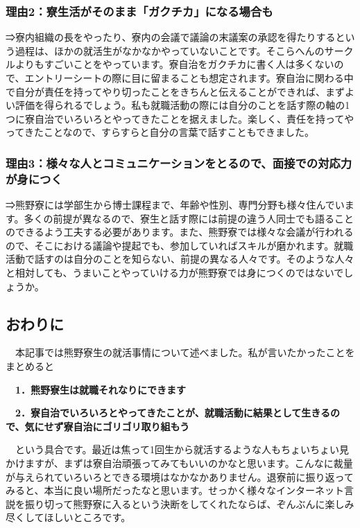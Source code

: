 \subsubsection{理由2：寮生活がそのまま「ガクチカ」になる場合も}
⇒寮内組織の長をやったり、寮内の会議で議論の末議案の承認を得たりするという過程は、ほかの就活生がなかなかやっていないことです。そこらへんのサークルよりもすごいことをやっています。寮自治をガクチカに書く人は多くないので、エントリーシートの際に目に留まることも想定されます。寮自治に関わる中で自分が責任を持ってやり切ったことをきちんと伝えることができれば、まずよい評価を得られるでしょう。私も就職活動の際には自分のことを話す際の軸の1つに寮自治でいろいろとやってきたことを据えました。楽しく、責任を持ってやってきたことなので、すらすらと自分の言葉で話すこともできました。

\subsubsection{理由3：様々な人とコミュニケーションをとるので、面接での対応力が身につく}
⇒熊野寮には学部生から博士課程まで、年齢や性別、専門分野も様々住んでいます。多くの前提が異なるので、寮生と話す際には前提の違う人同士でも語ることのできるよう工夫する必要があります。また、熊野寮では様々な会議が行われるので、そこにおける議論や提起でも、参加していればスキルが磨かれます。就職活動で話すのは自分のことを知らない、前提の異なる人々です。そのような人々と相対しても、うまいことやっていける力が熊野寮では身につくのではないでしょうか。

\subsection{おわりに}
　本記事では熊野寮生の就活事情について述べました。私が言いたかったことをまとめると

\textbf{　1．熊野寮生は就職それなりにできます}

\textbf{　2．寮自治でいろいろとやってきたことが、就職活動に結果として生きるので、気にせず寮自治にゴリゴリ取り組もう}

　という具合です。最近は焦って1回生から就活するような人もちょいちょい見かけますが、まずは寮自治頑張ってみてもいいのかなと思います。こんなに裁量が与えられていろいろとできる環境はなかなかありません。退寮前に振り返ってみると、本当に良い場所だったなと思います。せっかく様々なインターネット言説を振り切って熊野寮に入るという決断をしてくれたならば、ぞんぶんに楽しみ尽くしてほしいところです。